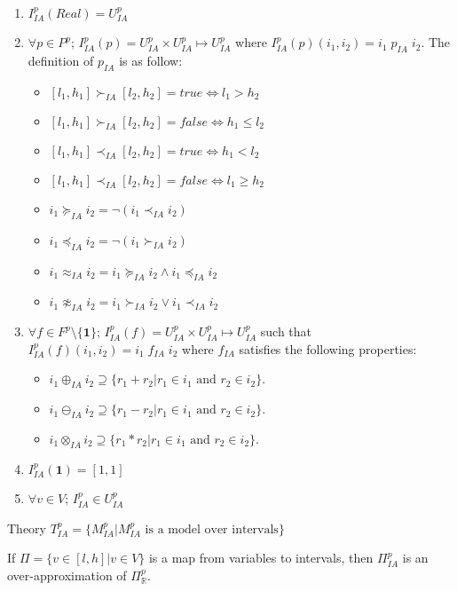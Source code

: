 \begin{enumerate}
\item $I^p_{IA}(Real) = U^p_{IA}$
\item $\forall p \in P^p$; $I^p_{IA}(p)= U^p_{IA} \times U^p_{IA} \mapsto U^p_{IA}$ where $I^p_{IA}(p)(i_1, i_2) = i_1 \; p_{IA} \; i_2$. The definition of $ p_{IA}$ is as follow:
\begin{itemize}
\item $[l_1, h_1] \succ_{IA} [l_2,  h_2] = true \iff l_1 > h_2$
\item $[l_1, h_1] \succ_{IA} [l_2,  h_2] = false \iff h_1 \le l_2$
\item $[l_1, h_1] \prec_{IA} [l_2,  h_2] = true \iff h_1 < l_2$
\item $[l_1, h_1] \prec_{IA} [l_2,  h_2] = false \iff l_1 \ge h_2$
\item $i_1 \succeq_{IA} i_2 = \neg(i_1 \prec_{IA} i_2)$
\item $i_1 \preceq_{IA} i_2 = \neg(i_1 \succ_{IA} i_2)$
\item $i_1 \approx_{IA} i_2 = i_1 \succeq_{IA} i_2 \wedge i_1 \preceq_{IA} i_2$
\item $i_1 \not\approx_{IA} i_2 = i_1 \succ_{IA} i_2 \vee i_1 \prec_{IA} i_2$
\end{itemize}
\item $\forall f \in F^p \setminus \{\mathbf{1}\}$; $I^p_{IA}(f) = U^p_{IA} \times U^p_{IA} \mapsto U^p_{IA}$ such that $ I^p_{IA}(f)(i_1, i_2)= i_1 \; f_{IA} \; i_2$ where $f_{IA}$ satisfies the following properties:
\begin{itemize}
\item $i_1 \oplus_{IA} i_2 \supseteq \{r_1 + r_2| r_1 \in i_1 \text{ and } r_2 \in i_2\}$.
\item $i_1 \ominus_{IA} i_2 \supseteq \{r_1 - r_2| r_1 \in i_1 \text{ and } r_2 \in i_2\}$.
\item $i_1 \otimes_{IA} i_2 \supseteq \{r_1 * r_2| r_1 \in i_1 \text{ and } r_2 \in i_2\}$.
\end{itemize}
\item $I^p_{IA}(\mathbf{1}) = [1,1]$
\item $\forall v \in V$; $I^p_{IA} \in U^p_{IA}$
\end{enumerate}
Theory $T^p_{IA} = \{M^p_{IA}| M^p_{IA} \text{ is a model over intervals}\}$

\begin{theorem}
If $\Pi = \{v \in [l, h] | v \in V\}$ is a map from variables to intervals, then $\Pi^p_{IA}$ is an over-approximation of $\Pi^p_\mathbb{R}$.
\end{theorem}

